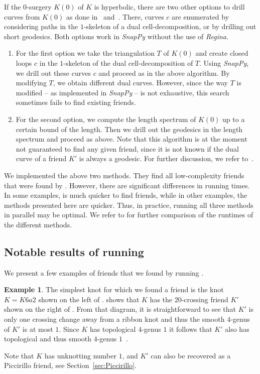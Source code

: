 \documentclass{amsart} %
\theoremstyle{thm}
\theoremstyle{definition}
\newtheorem{ex}[Theorem]{Example}
\numberwithin{equation}{section}
\begin{document}
If the $0$-surgery $K(0)$ of $K$ is hyperbolic, there are two other options to drill curves from $K(0)$ as done in~\cite{Dunfield_exterior_to_link} and~\cite{Dunfield_Gong}. There, curves $c$ are enumerated by considering paths in the $1$-skeleton of a dual cell-decomposition, or by drilling out short geodesics. Both options work in {\em SnapPy} without the use of {\em Regina}. 
\begin{enumerate}
    \item For the first option we take the triangulation $T$ of $K(0)$ and create closed loops $c$ in the $1$-skeleton of the dual cell-decomposition of $T$. Using {\em SnapPy}, we drill out these curves $c$ and proceed as in the above algorithm. By modifying $T$, we obtain different dual curves. However, since the way $T$ is modified -- as implemented in {\em SnapPy} -- is not exhaustive, this search sometimes fails to find existing friends. 
    \item For the second option, we compute the length spectrum of $K(0)$ up to a certain bound of the length. Then we drill out the geodesics in the length spectrum and proceed as above. Note that this algorithm is at the moment not guaranteed to find any given friend, since it is not known if the dual curve of a friend $K'$ is always a geodesic. For further discussion, we refer to~\cite{Dunfield_Gong}.
\end{enumerate}
We implemented the above two methods. They find all low-complexity friends that were found by . However, there are significant differences in running times. In some examples,  is much quicker to find friends, while in other examples, the methods presented here are quicker. Thus, in practice, running all three methods in parallel may be optimal. We refer to  for further comparison of the runtimes of the different methods.

\subsection{Notable results of running }

We present a few examples of friends that we found by running .

\begin{ex}
The simplest knot for which we found a friend is the knot $K=K6a2$ shown on the left of .  shows that $K$ has the $20$-crossing friend $K'$ shown on the right of . From that diagram, it is straightforward to see that $K'$ is only one crossing change away from a ribbon knot and thus the smooth $4$-genus of $K'$ is at most $1$. Since $K$ has topological $4$-genus $1$ it follows that $K'$ also has topological and thus smooth $4$-genus $1$~\cite{Freedman}. 

Note that $K$ has unknotting number $1$, and $K'$ can also be recovered as a Piccirillo friend, see Section~\ref{sec:Piccirillo}.
\end{ex}
\end{document}
